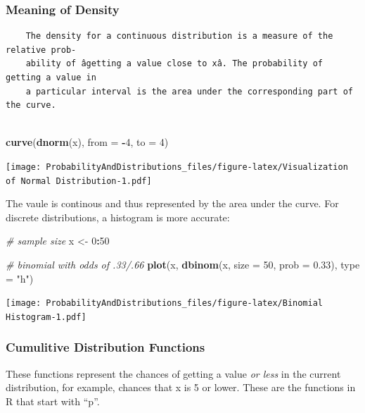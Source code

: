 \documentclass[]{article}
\newenvironment{Shaded}{\begin{snugshade}}{\end{snugshade}}
\newcommand{\KeywordTok}[1]{\textcolor[rgb]{0.13,0.29,0.53}{\textbf{#1}}}
\newcommand{\DataTypeTok}[1]{\textcolor[rgb]{0.13,0.29,0.53}{#1}}
\newcommand{\DecValTok}[1]{\textcolor[rgb]{0.00,0.00,0.81}{#1}}
\newcommand{\FloatTok}[1]{\textcolor[rgb]{0.00,0.00,0.81}{#1}}
\newcommand{\StringTok}[1]{\textcolor[rgb]{0.31,0.60,0.02}{#1}}
\newcommand{\CommentTok}[1]{\textcolor[rgb]{0.56,0.35,0.01}{\textit{#1}}}
\newcommand{\OperatorTok}[1]{\textcolor[rgb]{0.81,0.36,0.00}{\textbf{#1}}}
\newcommand{\NormalTok}[1]{#1}
\begin{document}
\subsubsection{Meaning of Density}\label{meaning-of-density}

\begin{verbatim}
    The density for a continuous distribution is a measure of the relative prob-
    ability of âgetting a value close to xâ. The probability of getting a value in
    a particular interval is the area under the corresponding part of the curve.
    
\end{verbatim}

\begin{Shaded}
\begin{Highlighting}[]
\KeywordTok{curve}\NormalTok{(}\KeywordTok{dnorm}\NormalTok{(x), }\DataTypeTok{from =} \OperatorTok{-}\DecValTok{4}\NormalTok{, }\DataTypeTok{to =} \DecValTok{4}\NormalTok{)}
\end{Highlighting}
\end{Shaded}

\texttt{[image: ProbabilityAndDistributions\_files/figure-latex/Visualization of Normal Distribution-1.pdf]}

The vaule is continous and thus represented by the area under the curve.
For discrete distributions, a histogram is more accurate:

\begin{Shaded}
\begin{Highlighting}[]
\CommentTok{# sample size}
\NormalTok{x <-}\StringTok{ }\DecValTok{0}\OperatorTok{:}\DecValTok{50}

\CommentTok{# binomial with odds of .33/.66}
\KeywordTok{plot}\NormalTok{(x, }\KeywordTok{dbinom}\NormalTok{(x, }\DataTypeTok{size =} \DecValTok{50}\NormalTok{, }\DataTypeTok{prob =} \FloatTok{0.33}\NormalTok{), }\DataTypeTok{type =} \StringTok{"h"}\NormalTok{)}
\end{Highlighting}
\end{Shaded}

\texttt{[image: ProbabilityAndDistributions\_files/figure-latex/Binomial Histogram-1.pdf]}

\subsubsection{Cumulitive Distribution
Functions}\label{cumulitive-distribution-functions}

These functions represent the chances of getting a value \emph{or less}
in the current distribution, for example, chances that x is 5 or lower.
These are the functions in R that start with ``p''.
\end{document}
